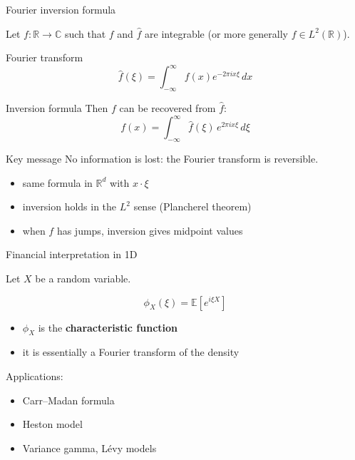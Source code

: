 \documentclass[aspectratio=169]{beamer}
\begin{document}
\begin{frame}{Fourier inversion formula}

Let $f:\mathbb{R}\to\mathbb{C}$ such that $f$ and $\hat f$ are integrable
(or more generally $f\in L^2(\mathbb{R})$).

\begin{block}{Fourier transform}
\[
\hat f(\xi)=\int_{-\infty}^{\infty}
f(x)e^{-2\pi i x \xi}\,dx
\]
\end{block}
\pause
\begin{block}{Inversion formula}
Then $f$ can be recovered from $\hat f$:
\[
f(x)=\int_{-\infty}^{\infty}
\hat f(\xi)\,e^{2\pi i x \xi}\,d\xi
\]
\end{block}
\pause
\vspace{-6mm}
\begin{block}{Key message}
No information is lost: the Fourier transform is reversible.
\end{block}

\begin{itemize}
    \item same formula in $\mathbb{R}^d$ with $x\cdot \xi$
    \item inversion holds in the $L^2$ sense (Plancherel theorem)
    \item when $f$ has jumps, inversion gives midpoint values
\end{itemize}

\end{frame}

\begin{frame}{Financial interpretation in 1D}

Let $X$ be a random variable.

\[
\phi_X(\xi)=\mathbb{E}\left[e^{i\xi X}\right]
\]
\pause
\begin{itemize}
    \item $\phi_X$ is the \textbf{characteristic function}
    \item it is essentially a Fourier transform of the density
\end{itemize}

Applications:
\begin{itemize}
    \item Carr–Madan formula
    \item Heston model
    \item Variance gamma, Lévy models
\end{itemize}

\end{frame}
\end{document}
